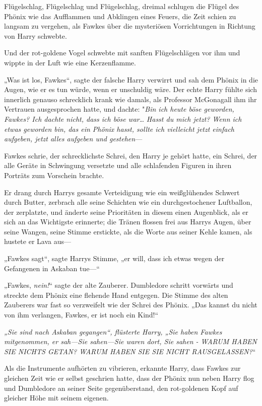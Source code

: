 {Flügelschlag, Flügelschlag und Flügelschlag, dreimal schlugen die Flügel des Phönix wie das Aufflammen und Abklingen eines Feuers, die Zeit schien zu langsam zu vergehen, als Fawkes über die mysteriösen Vorrichtungen in Richtung von Harry schwebte.

Und der rot-goldene Vogel schwebte mit sanften Flügelschlägen vor ihm und wippte in der Luft wie eine Kerzenflamme.

„Was ist los, Fawkes“, sagte der falsche Harry verwirrt und sah dem Phönix in die Augen, wie er es tun würde, wenn er unschuldig wäre. Der echte Harry fühlte sich innerlich genauso schrecklich krank wie damals, als Professor McGonagall ihm ihr Vertrauen ausgesprochen hatte, und dachte: "\emph{Bin ich heute böse geworden, Fawkes? Ich dachte nicht, dass ich böse} \emph{war}… \emph{Hasst du mich jetzt? Wenn ich etwas geworden bin, das ein Phönix hasst, sollte ich vielleicht jetzt einfach aufgeben, jetzt alles aufgeben und gestehen}—

Fawkes schrie, der schrecklichste Schrei, den Harry je gehört hatte, ein Schrei, der alle Geräte in Schwingung versetzte und alle schlafenden Figuren in ihren Porträts zum Vorschein brachte.

Er drang durch Harrys gesamte Verteidigung wie ein weißglühendes Schwert durch Butter, zerbrach alle seine Schichten wie ein durchgestochener Luftballon, der zerplatzte, und änderte seine Prioritäten in diesem einen Augenblick, als er sich an das Wichtigste erinnerte; die Tränen flossen frei aus Harrys Augen, über seine Wangen, seine Stimme erstickte, als die Worte aus seiner Kehle kamen, als hustete er Lava aus—

„Fawkes sagt“, sagte Harrys Stimme, „er will, dass ich etwas wegen der Gefangenen in Askaban tue—“

„Fawkes, \emph{nein!}“ sagte der alte Zauberer. Dumbledore schritt vorwärts und streckte dem Phönix eine flehende Hand entgegen. Die Stimme des alten Zauberers war fast so verzweifelt wie der Schrei des Phönix. „Das kannst du nicht von ihm verlangen, Fawkes, er ist noch ein Kind!“

\emph{„Sie sind nach Askaban gegangen“, flüsterte Harry, „Sie haben Fawkes mitgenommen, er sah—\emph{Sie} sahen—Sie waren \emph{dort}, Sie sahen - WARUM HABEN SIE NICHTS GETAN? WARUM HABEN SIE SIE NICHT RAUSGELASSEN?}“

Als die Instrumente aufhörten zu vibrieren, erkannte Harry, dass Fawkes zur gleichen Zeit wie er selbst geschrien hatte, dass der Phönix nun neben Harry flog und Dumbledore an seiner Seite gegenüberstand, den rot-goldenen Kopf auf gleicher Höhe mit seinem eigenen.

}
